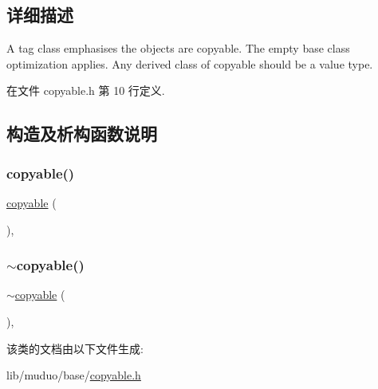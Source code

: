 \subsection{详细描述}
A tag class emphasises the objects are copyable. The empty base class optimization applies. Any derived class of copyable should be a value type. 

在文件 copyable.\+h 第 10 行定义.



\subsection{构造及析构函数说明}
\mbox{\label{classmuduo_1_1copyable_ac8579356ab6a1c47424c42769858aaee}} 
\subsubsection{\texorpdfstring{copyable()}{copyable()}}
{\footnotesize\ttfamily \hyperlink{classmuduo_1_1copyable}{copyable} (\begin{DoxyParamCaption}{ }\end{DoxyParamCaption})\hspace{0.3cm}{\ttfamily [protected]}, {\ttfamily [default]}}

\mbox{\label{classmuduo_1_1copyable_a9b4f930d069a7d0cd78c4f6c19c94727}} 
\subsubsection{\texorpdfstring{$\sim$copyable()}{~copyable()}}
{\footnotesize\ttfamily $\sim$\hyperlink{classmuduo_1_1copyable}{copyable} (\begin{DoxyParamCaption}{ }\end{DoxyParamCaption})\hspace{0.3cm}{\ttfamily [protected]}, {\ttfamily [default]}}



该类的文档由以下文件生成\+:\begin{DoxyCompactItemize}
\item 
lib/muduo/base/\hyperlink{copyable_8h}{copyable.\+h}\end{DoxyCompactItemize}
